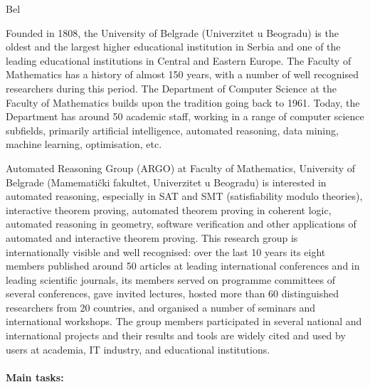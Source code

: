 \begin{sitedescription}{Bel}

  
  Founded in 1808, the University of Belgrade (Univerzitet u Beogradu)
  is the oldest and the largest higher educational institution in
  Serbia and one of the leading educational institutions in Central
  and Eastern Europe. The Faculty of Mathematics has a history of
  almost 150 years, with a number of well recognised researchers
  during this period. The Department of Computer Science at the
  Faculty of Mathematics builds upon the tradition going back to
  1961. Today, the Department has around 50 academic staff, working in
  a range of computer science subfields, primarily artificial
  intelligence, automated reasoning, data mining, machine learning,
  optimisation, etc.


  Automated Reasoning Group (ARGO) at Faculty of Mathematics,
  University of Belgrade (Mamematički fakultet, Univerzitet u
  Beogradu) is interested in automated reasoning, especially in SAT
  and SMT (satisfiability modulo theories), interactive theorem
  proving, automated theorem proving in coherent logic, automated
  reasoning in geometry, software verification and other applications
  of automated and interactive theorem proving. This research group is
  internationally visible and well recognised: over the last 10 years
  its eight members published around 50 articles at leading
  international conferences and in leading scientific journals, its
  members served on programme committees of several conferences, gave
  invited lectures, hosted more than 60 distinguished researchers from
  20 countries, and organised a number of seminars and international
  workshops. The group members participated in several national and
  international projects and their results and tools are widely cited
  and used by users at academia, IT industry, and educational
  institutions.

  \paragraph*{Main tasks:}


\end{sitedescription}
